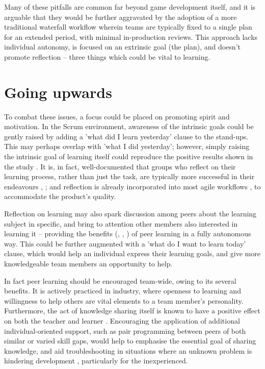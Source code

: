 \documentclass{scrartcl}
\begin{document}
Many of these pitfalls are common far beyond game development itself, and it is arguable that they would be further aggravated by the adoption of a more traditional waterfall workflow \cite{waterfall} wherein teams are typically fixed to a single plan for an extended period, with minimal in-production reviews. This approach lacks individual autonomy, is focused on an extrinsic goal (the plan), and doesn't promote reflection -- three things which could be vital to learning.

\section{Going upwards}
To combat these issues, a focus could be placed on promoting spirit and motivation. In the Scrum environment, awareness of the intrinsic goals could be gently raised by adding a 'what did I learn yesterday' clause to the stand-ups. This may perhaps overlap with 'what I did yesterday'; however, simply raising the intrinsic goal of learning itself could reproduce the positive results shown in the study \cite{motivation}. It is, in fact, well-documented that groups who reflect on their learning process, rather than just the task, are typically more successful in their endeavours \cite{effectivegroups}, \cite{learnreflection}; and reflection is already incorporated into most agile workflows \cite{agile}, \cite{scrum} to accommodate the product's quality.

Reflection on learning may also spark discussion among peers about the learning subject in specific, and bring to attention other members also interested in learning it -- providing the benefits (\cite{collaboration}, \cite{motivation}, \cite{group2005}) of peer learning in a fully autonomous way. This could be further augmented with a 'what do I want to learn today' clause, which would help an individual express their learning goals, and give more knowledgeable team members an opportunity to help. 

In fact peer learning should be encouraged team-wide, owing to its several benefits. It is actively practiced in industry, where openness to learning \cite{devstudy} and willingness to help others \cite{collaboration} are vital elements to a team member's personality. Furthermore, the act of knowledge sharing itself is known to have a positive effect on both the teacher and learner \cite{activepassive} \cite{motivation}. Encouraging the application of additional individual-oriented support, such as pair programming between peers of both similar or varied skill gaps, would help to emphasise the essential goal of sharing knowledge, and aid troubleshooting in situations where an unknown problem is hindering development \cite{collaboration} \cite{motivation} \cite{devstudy}, particularly for the inexperienced.
\end{document}
